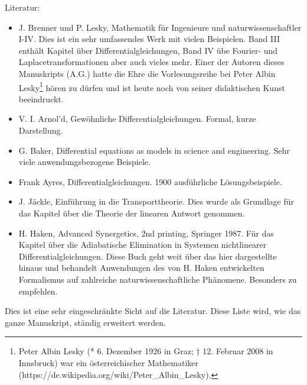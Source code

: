 \documentclass[a4paper,12pt]{book}%
\begin{document}
Literatur:
\begin{itemize}
  \item J. Brenner und P. Lesky, Mathematik für Ingenieure und
    naturwissenschaftler I-IV. Dies ist ein sehr umfassendes Werk mit vielen
    Beispielen. Band III enthält Kapitel über Differentialgleichungen, Band IV
    übe Fourier- und Laplacetransformationen aber auch vieles mehr. Einer der
    Autoren dieses Manuskripts (A.G.) hatte die Ehre die Vorlesungsreihe bei
    Peter Albin Lesky\footnote{Peter Albin Lesky (* 6. Dezember 1926 in Graz; †
    12. Februar 2008 in Innsbruck) war ein österreichischer Mathematiker
    (https://de.wikipedia.org/wiki/Peter\_Albin\_Lesky). } hören zu dürfen und ist
    heute noch von seiner didaktischen Kunst beeindruckt.
  \item V. I. Arnol'd, Gewöhnliche Differentialgleichungen. Formal, kurze
    Darstellung.
  \item G. Baker, Differential equations as models in science and engineering.
    Sehr viele anwendungsbezogene Beispiele.
  \item Frank Ayres, Differentialgleichungen. 1900 ausführliche Lösungsbeispiele.
  \item J. Jäckle, Einführung in die Transporttheorie. Dies wurde als Grundlage
    für das Kapitel über die Theorie der linearen Antwort genommen.
  \item H. Haken, Advanced Synergetics, 2nd printing, Springer 1987. Für das
    Kapitel über die Adiabatische Elimination in Systemen nichtlinearer
    Differentialgleichungen. Diese Buch geht weit über das hier dargestellte
    hinaus und behandelt Anwendungen des von H. Haken entwickelten Formalismus
    auf zahlreiche naturwissenschaftliche Phänomene. Besonders zu empfehlen.
\end{itemize}
Dies ist eine sehr eingeschränkte Sicht auf die Literatur. Diese Liste wird,
wie das ganze Manuskript, ständig erweitert werden.
\newpage
\tableofcontents
\newpage 
\mainmatter





%


%
%
\begin{appendices}
\noappendicestocpagenum
\renewcommand\appendixtocname{Anhang}
\renewcommand\appendixpagename{Anhang}


\end{appendices}
\end{document}
